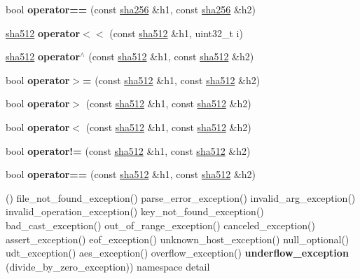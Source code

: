 \begin{DoxyCompactItemize}
bool {\bfseries operator==} (const \mbox{\hyperlink{classfc_1_1sha256}{sha256}} \&h1, const \mbox{\hyperlink{classfc_1_1sha256}{sha256}} \&h2)
\item 
\mbox{\label{namespacefc_ac497c8e902d9157a216662219a4f6d0a}} 
\mbox{\hyperlink{classfc_1_1sha512}{sha512}} {\bfseries operator$<$$<$} (const \mbox{\hyperlink{classfc_1_1sha512}{sha512}} \&h1, uint32\+\_\+t i)
\item 
\mbox{\label{namespacefc_add49b3172e59af1ec04cf06783cb4a01}} 
\mbox{\hyperlink{classfc_1_1sha512}{sha512}} {\bfseries operator$^\wedge$} (const \mbox{\hyperlink{classfc_1_1sha512}{sha512}} \&h1, const \mbox{\hyperlink{classfc_1_1sha512}{sha512}} \&h2)
\item 
\mbox{\label{namespacefc_ac8dfe396d0ee959ecfe5878528781374}} 
bool {\bfseries operator$>$=} (const \mbox{\hyperlink{classfc_1_1sha512}{sha512}} \&h1, const \mbox{\hyperlink{classfc_1_1sha512}{sha512}} \&h2)
\item 
\mbox{\label{namespacefc_a350d717b6babc72bb4dd937734ebde8c}} 
bool {\bfseries operator$>$} (const \mbox{\hyperlink{classfc_1_1sha512}{sha512}} \&h1, const \mbox{\hyperlink{classfc_1_1sha512}{sha512}} \&h2)
\item 
\mbox{\label{namespacefc_a70ca5dd4e7e81f3e7fa6e964bb2efcee}} 
bool {\bfseries operator$<$} (const \mbox{\hyperlink{classfc_1_1sha512}{sha512}} \&h1, const \mbox{\hyperlink{classfc_1_1sha512}{sha512}} \&h2)
\item 
\mbox{\label{namespacefc_a01d4179873c5bd7f231fd1baf2a0bfe9}} 
bool {\bfseries operator!=} (const \mbox{\hyperlink{classfc_1_1sha512}{sha512}} \&h1, const \mbox{\hyperlink{classfc_1_1sha512}{sha512}} \&h2)
\item 
\mbox{\label{namespacefc_a98bad035c9028a4cf1523e9a3a327335}} 
bool {\bfseries operator==} (const \mbox{\hyperlink{classfc_1_1sha512}{sha512}} \&h1, const \mbox{\hyperlink{classfc_1_1sha512}{sha512}} \&h2)
\item 
\mbox{\label{namespacefc_a4ae4b0d19313565d73c7d881cab45588}} 
() file\+\_\+not\+\_\+found\+\_\+exception() parse\+\_\+error\+\_\+exception() invalid\+\_\+arg\+\_\+exception() invalid\+\_\+operation\+\_\+exception() key\+\_\+not\+\_\+found\+\_\+exception() bad\+\_\+cast\+\_\+exception() out\+\_\+of\+\_\+range\+\_\+exception() canceled\+\_\+exception() assert\+\_\+exception() eof\+\_\+exception() unknown\+\_\+host\+\_\+exception() null\+\_\+optional() udt\+\_\+exception() aes\+\_\+exception() overflow\+\_\+exception() {\bfseries underflow\+\_\+exception} (divide\+\_\+by\+\_\+zero\+\_\+exception)) namespace detail

\end{DoxyCompactItemize}
